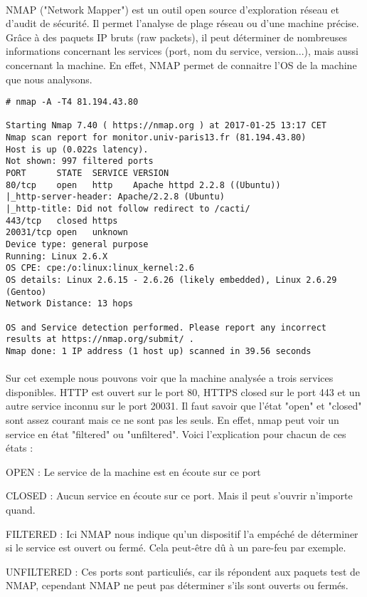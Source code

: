 \documentclass[12pt]{report}
\begin{document}
		\paragraph{}
			NMAP ("Network Mapper") est un outil open source d'exploration réseau et d'audit de sécurité. Il permet l'analyse de plage réseau ou d'une machine précise. Grâce à des paquets IP bruts (raw packets), il peut déterminer de nombreuses informations concernant les services (port, nom du service, version...), mais aussi concernant la machine. En effet, NMAP permet de connaitre l'OS de la machine que nous analysons.
			\begin{lstlisting}[caption=Scan NMAP, captionpos=b]
# nmap -A -T4 81.194.43.80

Starting Nmap 7.40 ( https://nmap.org ) at 2017-01-25 13:17 CET
Nmap scan report for monitor.univ-paris13.fr (81.194.43.80)
Host is up (0.022s latency).
Not shown: 997 filtered ports
PORT      STATE  SERVICE VERSION
80/tcp    open   http    Apache httpd 2.2.8 ((Ubuntu))
|_http-server-header: Apache/2.2.8 (Ubuntu)
|_http-title: Did not follow redirect to /cacti/
443/tcp   closed https
20031/tcp open   unknown
Device type: general purpose
Running: Linux 2.6.X
OS CPE: cpe:/o:linux:linux_kernel:2.6
OS details: Linux 2.6.15 - 2.6.26 (likely embedded), Linux 2.6.29 (Gentoo)
Network Distance: 13 hops

OS and Service detection performed. Please report any incorrect results at https://nmap.org/submit/ .
Nmap done: 1 IP address (1 host up) scanned in 39.56 seconds
			\end{lstlisting}
			\paragraph{}
				Sur cet exemple nous pouvons voir que la machine analysée a trois services disponibles. HTTP est ouvert sur le port 80, HTTPS closed sur le port 443 et un autre service inconnu sur le port 20031. Il faut savoir que l'état "open" et "closed" sont assez courant mais ce ne sont pas les seuls. En effet, nmap peut voir un service en état "filtered" ou "unfiltered". Voici l'explication pour chacun de ces états :
			\begin{description}
			\item OPEN : Le service de la machine est en écoute sur ce port
			\item CLOSED : Aucun service en écoute sur ce port. Mais il peut s'ouvrir n'importe quand.
			\item FILTERED : Ici NMAP nous indique qu'un dispositif l'a empéché de déterminer si le service est ouvert ou fermé. Cela peut-être dû à un pare-feu par exemple.
			\item UNFILTERED : Ces ports sont particuliés, car ils répondent aux paquets test de NMAP, cependant NMAP ne peut pas déterminer s'ils sont ouverts ou fermés.
			\end{description}
\end{document}
